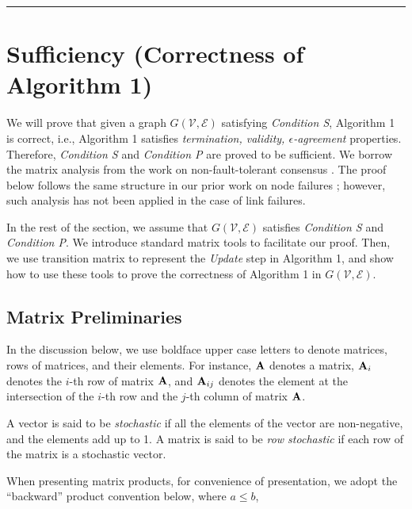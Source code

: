 \documentclass{llncs}
\newcommand{\scripte}{\mathcal{E}}
\newcommand{\scriptv}{\mathcal{V}}
\newcommand{\bfA}{{\bf A}}
\begin{document}
\hrule



\section{Sufficiency (Correctness of Algorithm 1)}
\label{s:sufficiency}

We will prove that given a graph $G(\scriptv, \scripte)$ satisfying {\em Condition S}, Algorithm 1 is correct, i.e., Algorithm 1 satisfies {\em termination, validity, $\epsilon$-agreement} properties. Therefore, {\em Condition S} and {\em Condition P} are proved to be sufficient. We borrow the matrix analysis from the work on non-fault-tolerant consensus \cite{Jadbabaie,AA_convergence_markov}. The proof below follows the same structure in our prior work on node failures \cite{Tseng_general,vaidya_icdcn14}; however, such analysis has not been applied in the case of link failures.

In the rest of the section, we assume that $G(\scriptv,\scripte)$ satisfies {\em Condition S}  and {\em Condition P}. We introduce standard matrix tools to facilitate our proof. Then, we use transition matrix to represent the {\em Update} step in Algorithm 1, and show how to use these tools to prove the correctness of Algorithm 1 in $G(\scriptv,\scripte)$.



\subsection{Matrix Preliminaries}


In the discussion below, we use boldface upper case letters to denote matrices,
rows of matrices, and their elements. For instance,
$\bfA$ denotes a matrix, $\bfA_i$ denotes the $i$-th row of
matrix $\bfA$, and $\bfA_{ij}$ denotes the element at the
intersection of the $i$-th row and the $j$-th column
of matrix $\bfA$.

\begin{definition}
\label{d_stochastic}
A vector is said to be {\em stochastic} if all the elements
of the vector are non-negative, and the elements add up to 1.
A matrix is said to be {\em row stochastic} if each row of the matrix is a
stochastic vector. 
\end{definition}

When presenting matrix products, for convenience of presentation, we adopt the ``backward'' product convention below, where $a \leq b$,
\end{document}
